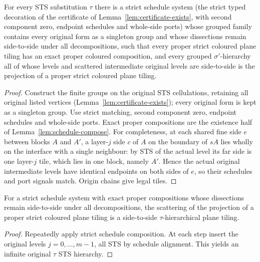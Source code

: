 \begin{lemma}\label{lem:strict-presentation}
For every STS substitution $\tau$ there is a strict schedule system (the
strict typed decoration of the certificate of
Lemma~\ref{lem:certificate-exists}, with second component zero, endpoint
schedules and whole-side ports) whose grouped family contains every original
form as a singleton group and whose dissections remain side-to-side under
all decompositions, such that every proper strict coloured plane tiling has
an exact proper coloured composition, and every grouped $\sigma'$-hierarchy
all of whose levels and scattered intermediate original levels are
side-to-side is the projection of a proper strict coloured plane tiling.
\end{lemma}
\begin{proof}
Construct the finite groups on the original STS cellulations, retaining all
original listed vertices (Lemma~\ref{lem:certificate-exists}); every original
form is kept as a singleton group. Use strict matching, second component
zero, endpoint schedules and whole-side ports. Exact proper compositions are
the existence half of Lemma~\ref{lem:schedule-compose}. For completeness, at
each shared fine side $e$ between blocks $A$ and $A'$, a layer-$j$ side $c$
of $A$ on the boundary of $sA$ lies wholly on the interface with a single
neighbour: by STS of the actual level its far side is one layer-$j$ tile,
which lies in one block, namely $A'$. Hence the actual original intermediate
levels have identical endpoints on both sides of $e$, so their schedules and
port signals match. Origin chains give legal tiles.
\end{proof}

\begin{lemma}\label{lem:strict-sound}
For a strict schedule system with exact proper compositions whose
dissections remain side-to-side under all decompositions, the scattering of
the projection of a proper strict coloured plane tiling is a side-to-side
$\tau$-hierarchical plane tiling.
\end{lemma}
\begin{proof}
Repeatedly apply strict schedule composition. At each step insert the
original levels $j=0,\ldots,m-1$, all STS by schedule alignment. This yields
an infinite original $\tau$ STS hierarchy.
\end{proof}

